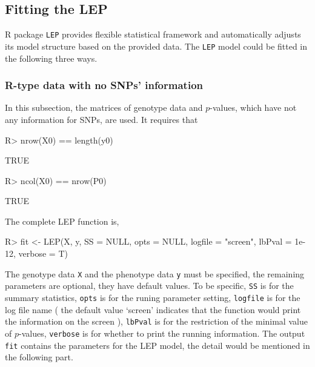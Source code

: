 \documentclass[11pt]{article}
\begin{document}
\subsection{Fitting the LEP}\label{fitting}

R package \texttt{LEP} provides flexible statistical framework
and automatically adjusts its model structure based on the provided data.
The \texttt{LEP} model could be fitted in the following three ways.


\subsubsection{R-type data with no SNPs' information}
In this subsection, the matrices of genotype data and $p$-values, which have not any information for SNPs, are used. It requires that
\begin{Schunk}
\begin{Sinput}
R> nrow(X0) == length(y0)
\end{Sinput}
\begin{Soutput}
[1] TRUE
\end{Soutput}
\begin{Sinput}
R> ncol(X0) == nrow(P0)
\end{Sinput}
\begin{Soutput}
[1] TRUE
\end{Soutput}
\end{Schunk}

The complete LEP function is,
\begin{Schunk}
\begin{Sinput}
R> fit <- LEP(X, y, SS = NULL, opts = NULL, logfile = "screen", lbPval = 1e-12,
                                                                    verbose = T)
\end{Sinput}
\end{Schunk}

The genotype data \texttt{X} and the phenotype data \texttt{y} must be specified, the remaining parameters are optional, they have default values. To be specific, \texttt{SS} is for the summary statistics, \texttt{opts} is for the runing parameter setting, \texttt{logfile} is for the log file name ( the default value `screen' indicates that the function would print the information on the screen ), \texttt{lbPval} is for the restriction of the minimal value of $p$-values, \texttt{verbose} is for whether to print the running information. The output \texttt{fit} contains the parameters for the LEP model, the detail would be mentioned in the following part.
\end{document}
